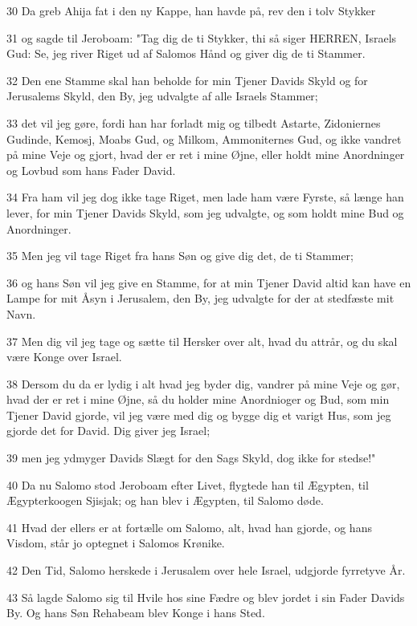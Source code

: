 \par 30 Da greb Ahija fat i den ny Kappe, han havde på, rev den i tolv Stykker
\par 31 og sagde til Jeroboam: "Tag dig de ti Stykker, thi så siger HERREN, Israels Gud: Se, jeg river Riget ud af Salomos Hånd og giver dig de ti Stammer.
\par 32 Den ene Stamme skal han beholde for min Tjener Davids Skyld og for Jerusalems Skyld, den By, jeg udvalgte af alle Israels Stammer;
\par 33 det vil jeg gøre, fordi han har forladt mig og tilbedt Astarte, Zidoniernes Gudinde, Kemosj, Moabs Gud, og Milkom, Ammoniternes Gud, og ikke vandret på mine Veje og gjort, hvad der er ret i mine Øjne, eller holdt mine Anordninger og Lovbud som hans Fader David.
\par 34 Fra ham vil jeg dog ikke tage Riget, men lade ham være Fyrste, så længe han lever, for min Tjener Davids Skyld, som jeg udvalgte, og som holdt mine Bud og Anordninger.
\par 35 Men jeg vil tage Riget fra hans Søn og give dig det, de ti Stammer;
\par 36 og hans Søn vil jeg give en Stamme, for at min Tjener David altid kan have en Lampe for mit Åsyn i Jerusalem, den By, jeg udvalgte for der at stedfæste mit Navn.
\par 37 Men dig vil jeg tage og sætte til Hersker over alt, hvad du attrår, og du skal være Konge over Israel.
\par 38 Dersom du da er lydig i alt hvad jeg byder dig, vandrer på mine Veje og gør, hvad der er ret i mine Øjne, så du holder mine Anordnioger og Bud, som min Tjener David gjorde, vil jeg være med dig og bygge dig et varigt Hus, som jeg gjorde det for David. Dig giver jeg Israel;
\par 39 men jeg ydmyger Davids Slægt for den Sags Skyld, dog ikke for stedse!"
\par 40 Da nu Salomo stod Jeroboam efter Livet, flygtede han til Ægypten, til Ægypterkoogen Sjisjak; og han blev i Ægypten, til Salomo døde.
\par 41 Hvad der ellers er at fortælle om Salomo, alt, hvad han gjorde, og hans Visdom, står jo optegnet i Salomos Krønike.
\par 42 Den Tid, Salomo herskede i Jerusalem over hele Israel, udgjorde fyrretyve År.
\par 43 Så lagde Salomo sig til Hvile hos sine Fædre og blev jordet i sin Fader Davids By. Og hans Søn Rehabeam blev Konge i hans Sted.

